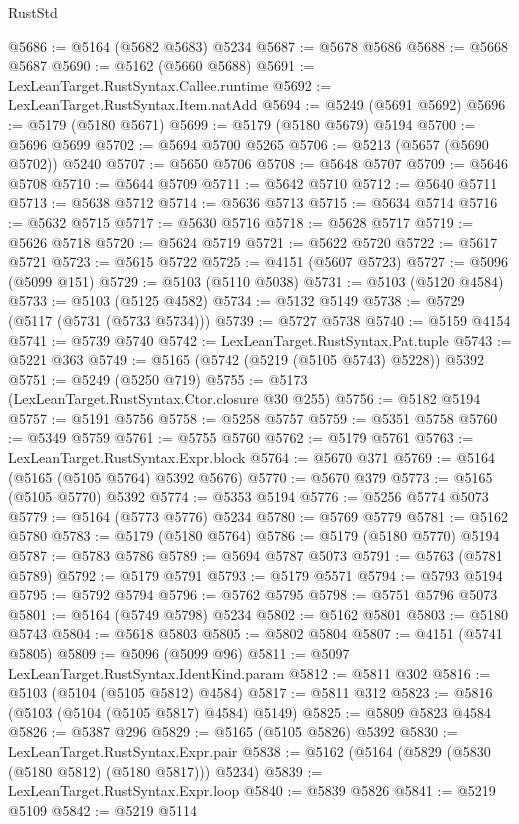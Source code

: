 \begin{lexlean}{RustStd}
\begin{coremodule}
@5686 := @5164 (@5682 @5683) @5234
@5687 := @5678 @5686
@5688 := @5668 @5687
@5690 := @5162 (@5660 @5688)
@5691 := LexLeanTarget.RustSyntax.Callee.runtime
@5692 := LexLeanTarget.RustSyntax.Item.natAdd
@5694 := @5249 (@5691 @5692)
@5696 := @5179 (@5180 @5671)
@5699 := @5179 (@5180 @5679) @5194
@5700 := @5696 @5699
@5702 := @5694 @5700 @5265
@5706 := @5213 (@5657 (@5690 @5702)) @5240
@5707 := @5650 @5706
@5708 := @5648 @5707
@5709 := @5646 @5708
@5710 := @5644 @5709
@5711 := @5642 @5710
@5712 := @5640 @5711
@5713 := @5638 @5712
@5714 := @5636 @5713
@5715 := @5634 @5714
@5716 := @5632 @5715
@5717 := @5630 @5716
@5718 := @5628 @5717
@5719 := @5626 @5718
@5720 := @5624 @5719
@5721 := @5622 @5720
@5722 := @5617 @5721
@5723 := @5615 @5722
@5725 := @4151 (@5607 @5723)
@5727 := @5096 (@5099 @151)
@5729 := @5103 (@5110 @5038)
@5731 := @5103 (@5120 @4584)
@5733 := @5103 (@5125 @4582)
@5734 := @5132 @5149
@5738 := @5729 (@5117 (@5731 (@5733 @5734)))
@5739 := @5727 @5738
@5740 := @5159 @4154
@5741 := @5739 @5740
@5742 := LexLeanTarget.RustSyntax.Pat.tuple
@5743 := @5221 @363
@5749 := @5165 (@5742 (@5219 (@5105 @5743) @5228)) @5392
@5751 := @5249 (@5250 @719)
@5755 := @5173 (LexLeanTarget.RustSyntax.Ctor.closure @30 @255)
@5756 := @5182 @5194
@5757 := @5191 @5756
@5758 := @5258 @5757
@5759 := @5351 @5758
@5760 := @5349 @5759
@5761 := @5755 @5760
@5762 := @5179 @5761
@5763 := LexLeanTarget.RustSyntax.Expr.block
@5764 := @5670 @371
@5769 := @5164 (@5165 (@5105 @5764) @5392 @5676)
@5770 := @5670 @379
@5773 := @5165 (@5105 @5770) @5392
@5774 := @5353 @5194
@5776 := @5256 @5774 @5073
@5779 := @5164 (@5773 @5776) @5234
@5780 := @5769 @5779
@5781 := @5162 @5780
@5783 := @5179 (@5180 @5764)
@5786 := @5179 (@5180 @5770) @5194
@5787 := @5783 @5786
@5789 := @5694 @5787 @5073
@5791 := @5763 (@5781 @5789)
@5792 := @5179 @5791
@5793 := @5179 @5571
@5794 := @5793 @5194
@5795 := @5792 @5794
@5796 := @5762 @5795
@5798 := @5751 @5796 @5073
@5801 := @5164 (@5749 @5798) @5234
@5802 := @5162 @5801
@5803 := @5180 @5743
@5804 := @5618 @5803
@5805 := @5802 @5804
@5807 := @4151 (@5741 @5805)
@5809 := @5096 (@5099 @96)
@5811 := @5097 LexLeanTarget.RustSyntax.IdentKind.param
@5812 := @5811 @302
@5816 := @5103 (@5104 (@5105 @5812) @4584)
@5817 := @5811 @312
@5823 := @5816 (@5103 (@5104 (@5105 @5817) @4584) @5149)
@5825 := @5809 @5823 @4584
@5826 := @5387 @296
@5829 := @5165 (@5105 @5826) @5392
@5830 := LexLeanTarget.RustSyntax.Expr.pair
@5838 := @5162 (@5164 (@5829 (@5830 (@5180 @5812) (@5180 @5817))) @5234)
@5839 := LexLeanTarget.RustSyntax.Expr.loop
@5840 := @5839 @5826
@5841 := @5219 @5109
@5842 := @5219 @5114

\end{coremodule}
\end{lexlean}
